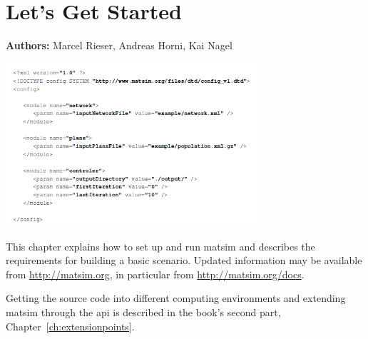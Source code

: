 \chapter{Let's Get Started}
\label{ch:lgstarted}
\hfill \textbf{Authors:} Marcel Rieser, Andreas Horni, Kai Nagel

\begin{center} \includegraphics[width=0.7\textwidth, angle=0]{using/figures/config.png} \end{center}


This chapter explains how to set up and run \gls{matsim} and describes the requirements for building a basic \gls{scenario}.  Updated information may be available from \url{http://matsim.org}, in particular from \url{http://matsim.org/docs}.


Getting the source code into different computing environments and extending \gls{matsim} through the \gls{api} is described in the book's second part, Chapter~\ref{ch:extensionpoints}.


